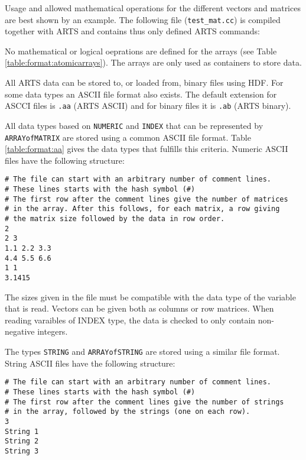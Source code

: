  Usage and allowed mathematical operations for the different vectors
 and matrices are best shown by an example. The following file
 (\verb|test_mat.cc|) is compiled together with ARTS and contains thus
 only defined ARTS commands: {\footnotesize
    }
 
 No mathematical or logical oeprations are defined for the arrays (see
 Table \ref{table:format:atomicarrays}). The arrays are only used as
 containers to store data.


 \label{sec:formats:files}

 All ARTS data can be stored to, or loaded from, binary files using HDF.
 For some data types an ASCII file format also exists. The default
 extension for ASCCI files is \verb|.aa| (ARTS ASCII) and for binary
 files it is \verb|.ab| (ARTS binary).
 
  \label{sec:formats:file:ascii}
  
  All data types based on \verb|NUMERIC| and \verb|INDEX| that can be
  represented by \verb|ARRAYofMATRIX| are stored using a common ASCII
  file format. Table \ref{table:format:aa} gives the data types that
  fulfills this criteria. Numeric ASCII files have the following 
  structure: \\
  {\footnotesize \begin{verbatim} 
# The file can start with an arbitrary number of comment lines.  
# These lines starts with the hash symbol (#) 
# The first row after the comment lines give the number of matrices 
# in the array. After this follows, for each matrix, a row giving 
# the matrix size followed by the data in row order.  
2 
2 3 
1.1 2.2 3.3 
4.4 5.5 6.6 
1 1 
3.1415
 \end{verbatim} 
}
     
 The sizes given in the file must be compatible with the data type
 of the variable that is read. Vectors can be given both as
 columns or row matrices. When reading varaibles of INDEX type,
 the data is checked to only contain non-negative integers.
 
 The types \verb|STRING| and \verb|ARRAYofSTRING| are stored using a
 similar file format. String ASCII files have the following structure:
 {\footnotesize \begin{verbatim} 
# The file can start with an arbitrary number of comment lines.
# These lines starts with the hash symbol (#)
# The first row after the comment lines give the number of strings
# in the array, followed by the strings (one on each row).  
3
String 1
String 2
String 3
 \end{verbatim} 
}

